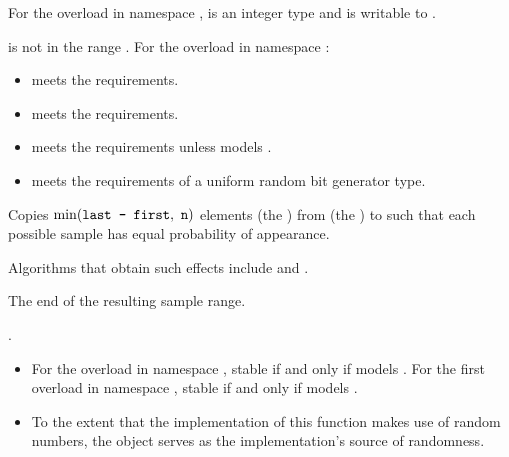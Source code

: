 \begin{itemdescr}
\pnum
\mandates
For the overload in namespace ,
 is an integer type and
 is writable to .

\pnum
\expects
{} is not in the range .
For the overload in namespace :
\begin{itemize}
\item
   meets
  the  requirements.
\item
   meets
  the  requirements.
\item
   meets
  the  requirements
  unless 
  models .
\item
   meets
  the requirements of a uniform random bit generator type.
\end{itemize}

\pnum
\effects
Copies $\min(\tcode{last - first}, \ \tcode{n})$ elements (the )
from  (the ) to 
such that each possible sample has equal probability of appearance.
\begin{note}
Algorithms that obtain such effects include 
and .
\end{note}

\pnum
\returns
The end of the resulting sample range.

\pnum
\complexity
{}.

\pnum
\remarks
\begin{itemize}
\item
  For the overload in namespace ,
  stable if and only if 
  models .
  For the first overload in namespace ,
  stable if and only if  models .
\item
  To the extent that the implementation of this function makes use
  of random numbers, the object  serves as
  the implementation's source of randomness.
\end{itemize}
\end{itemdescr}

